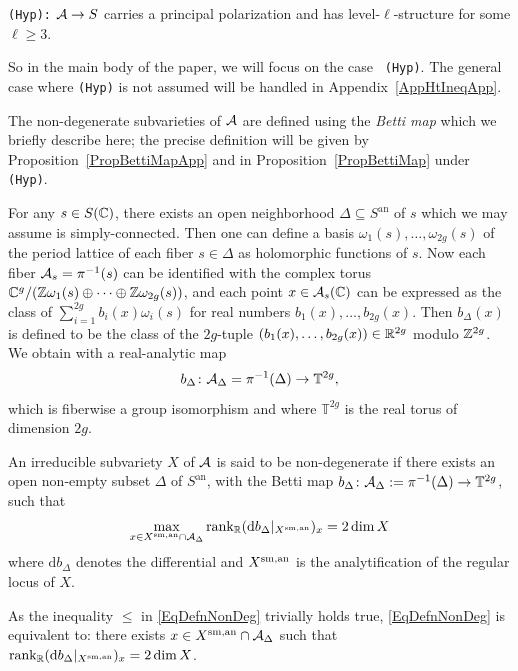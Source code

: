 \begin{center}
  \label{def:hyp}
  {\tt (Hyp):} $\mathcal{A}\rightarrow S$ carries a principal polarization and has level-$\ell$-structure for some $\ell \ge 3$.
\end{center}
So in the main body of the paper, we will focus on the case {\tt
(Hyp)}. The general case where {\tt (Hyp)} is not assumed will be
handled in Appendix~\ref{AppHtIneqApp}.


The non-degenerate subvarieties of $\mathcal{A}$ are defined using the
\textit{Betti map} which we briefly describe here; 
the precise definition will be given by
Proposition~\ref{PropBettiMapApp} and in Proposition~\ref{PropBettiMap} under {\tt (Hyp)}.

For any $s \in S({\mathbb{C}})$, there exists an open neighborhood $\Delta
\subseteq S^{\mathrm{an}}$ of $s$ which we may assume is simply-connected. Then one can define a basis $\omega_1(s),\ldots,\omega_{2g}(s)$ of the period lattice of each fiber $s \in \Delta$ as holomorphic functions of $s$. Now each fiber $\mathcal{A}_s = \pi^{-1}(s)$ can be identified with the complex torus ${\mathbb{C}}^g/({\mathbb{Z}} \omega_1(s)\oplus \cdots \oplus {\mathbb{Z}}\omega_{2g}(s))$, and each point $x \in \mathcal{A}_s({\mathbb{C}})$ can be expressed as the class of $\sum_{i=1}^{2g}b_i(x) \omega_i(s)$ for real numbers $b_1(x),\ldots,b_{2g}(x)$. Then $b_{\Delta}(x)$ is defined to be the class of the $2g$-tuple $(b_1(x),\ldots,b_{2g}(x)) \in {\mathbb{R}}^{2g}$ modulo ${\mathbb{Z}}^{2g}$.
We obtain with a real-analytic map
\[
b_{\Delta} \colon \mathcal{A}_{\Delta} = \pi^{-1}(\Delta) \rightarrow \mathbb{T}^{2g},
\]
which is fiberwise a group isomorphism and
where $\mathbb{T}^{2g}$ is the real torus of dimension $2g$.


\begin{definition}\label{DefinitionNonDegenerate}
An irreducible subvariety $X$ of $\mathcal{A}$ is said to be non-degenerate if
there exists an open non-empty subset $\Delta$ of $S^{\mathrm{an}}$,
with the Betti map
$b_{\Delta} \colon \mathcal{A}_{\Delta}:=\pi^{-1}(\Delta) \rightarrow \mathbb{T}^{2g}$, 
such that
\begin{equation}\label{EqDefnNonDeg}
\max_{x \in {X}^{\mathrm{sm,an}} \cap \mathcal{A}_{\Delta}} \mathrm{rank}_{{\mathbb{R}}} (\mathrm{d}b_{\Delta}|_{{X}^{\mathrm{sm,an}}})_x = 2\dim X
\end{equation}
where $\mathrm{d}b_\Delta$ denotes the differential and ${X}^{\mathrm{sm,an}}$ is
the analytification of the regular locus of $X$.
\end{definition}

As the inequality $\le$ in \eqref{EqDefnNonDeg} trivially holds true, \eqref{EqDefnNonDeg} is equivalent to: there exists $x \in {X}^{\mathrm{sm,an}} \cap \mathcal{A}_{\Delta}$ such that $\mathrm{rank}_{{\mathbb{R}}} (\mathrm{d}b_{\Delta}|_{{X}^{\mathrm{sm,an}}})_x = 2\dim X$.


